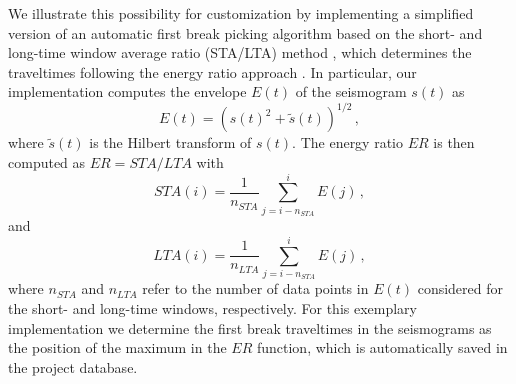 \documentclass[a4paper,fleqn]{cas-sc}
\begin{document}
We illustrate this possibility for customization by implementing 
a simplified version of an automatic first break picking algorithm based on the short- and long-time window average ratio (STA/LTA) method \citep{allen1978}, which determines the traveltimes following the energy ratio approach \citep[e.g.,][]{earle1994}. In particular, our implementation computes the envelope $E\left(t\right)$ of the seismogram $s\left(t\right)$ as \citep[e.g.,][]{duan2020}
\begin{equation}
	E(t)=\left(s\left(t\right)^2+\tilde{s}\left(t\right)\right)^{1/2}\,,
	\label{eq:envelope}
\end{equation}
where $\tilde{s}\left(t\right)$ is the Hilbert transform of $s\left(t\right)$. The energy ratio $ER$ is then computed as $ER=STA/LTA$ with
\begin{equation}
	STA\left(i\right)=\frac{1}{n_{STA}}\sum_{j=i-n_{STA}}^{i}E\left(j\right)\,,
	\label{eq:sta}
\end{equation}
and 
\begin{equation}
	LTA\left(i\right)=\frac{1}{n_{LTA}}\sum_{j=i-n_{STA}}^{i}E\left(j\right)\,,
	\label{eq:lta}
\end{equation}
where $n_{STA}$ and $n_{LTA}$ refer to the number of data points in $E\left(t\right)$ considered for the short- and long-time windows, respectively. For this exemplary implementation we determine the first break traveltimes in the seismograms as the position of the maximum in the $ER$ function, which is automatically saved in the project database. 
\end{document}

